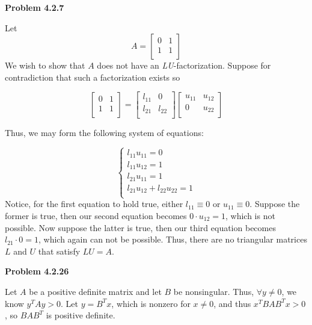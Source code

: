 \documentclass{article}
\newcommand{\Problem}[1]{\textbf{Problem #1}}
\begin{document}
\Problem{4.2.7}

Let 
\begin{equation*}
A = 
\begin{bmatrix}
	0 & 1\\
	1 & 1\\
\end{bmatrix}
\end{equation*}
We wish to show that $A$ does not have an \textit{LU}-factorization. Suppose for contradiction that such a factorization exists so 

\begin{equation*}
\begin{bmatrix}
0 & 1\\
1 & 1\\	
\end{bmatrix}
	=
\begin{bmatrix}
l_{11} & 0\\
l_{21} & l_{22}\\	
\end{bmatrix}
\begin{bmatrix}
u_{11} & u_{12}\\
0 & u_{22}\\	
\end{bmatrix}
\end{equation*}

Thus, we may form the following system of equations:

\begin{equation*}
\begin{cases}
	l_{11}u_{11} = 0\\
	l_{11}u_{12} = 1\\
	l_{21}u_{11} = 1\\
	l_{21}u_{12} + l_{22}u_{22} = 1\\
\end{cases}	
\end{equation*}
Notice, for the first equation to hold true, either $l_{11} \equiv 0$ or $u_{11} \equiv 0$. Suppose the former is true, then our second equation becomes $0\cdot u_{12} = 1$, which is not possible. Now suppose the latter is true, then our third equation becomes $l_{21}\cdot 0 = 1$, which again can not be possible. Thus, there are no triangular matrices $L$ and $U$ that satisfy $LU = A$. 

\Problem{4.2.26}

Let $A$ be a positive definite matrix and let $B$ be nonsingular. Thus, $\forall y \neq 0$, we know $y^TAy > 0$. Let $y = B^Tx$, which is nonzero for $x \neq 0$, and thus $x^TBAB^Tx > 0$, so $BAB^T$ is positive definite. 
\end{document}

